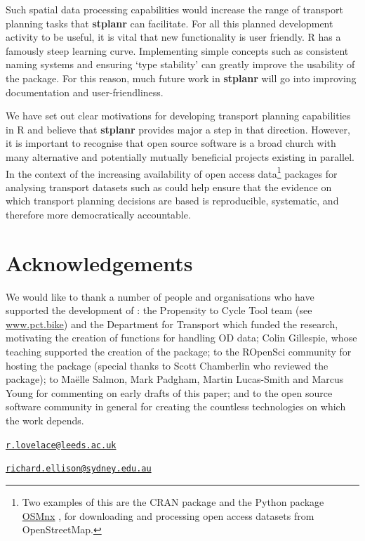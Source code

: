Such spatial data processing capabilities would increase the range of
transport planning tasks that \textbf{stplanr} can facilitate. For all
this planned development activity to be useful, it is vital that new
functionality is user friendly. R has a famously steep learning curve.
Implementing simple concepts such as consistent naming systems
\citep{baath_state_2012} and ensuring `type stability' can greatly
improve the usability of the package. For this reason, much future work
in \textbf{stplanr} will go into improving documentation and
user-friendliness.

We have set out clear motivations for
developing transport planning capabilities in R and believe that
\textbf{stplanr} provides major a step in that direction.
However, it is important to recognise that open source software is
a broad church with many alternative and potentially mutually beneficial
projects existing in parallel.
In the context of the increasing availability of open access data\footnote{Two
examples of this are the  CRAN package \citep{Padgham2017} and the Python package
\href{https://github.com/gboeing/osmnx}{OSMnx} \citep{boeing_osmnx:_2017}, for downloading and processing
open access datasets from OpenStreetMap.}
packages for analysing transport datasets such as  could help
ensure that the
evidence on which transport planning decisions are based is reproducible,
systematic, and therefore more democratically accountable.

\section{Acknowledgements}

We would like to thank a number of people and organisations who have supported the development of :
the Propensity to Cycle Tool team (see \href{http://www.pct.bike/}{www.pct.bike}) and the Department for Transport which funded the research, motivating the creation of functions for handling OD data;
Colin Gillespie, whose teaching supported the creation of the package;
to the ROpenSci community for hosting the package (special thanks to Scott Chamberlin who reviewed the package);
to Ma{\"e}lle Salmon, Mark Padgham, Martin Lucas-Smith and Marcus Young for commenting on early drafts of this paper;
and to the open source software community in general for creating the countless technologies on which the work depends.



\address{%
Robin Lovelace\\
University of Leeds\\
34-40 University Road\\ LS2 9JT, UK\\
}
\href{mailto:r.lovelace@leeds.ac.uk}{\nolinkurl{r.lovelace@leeds.ac.uk}}

\address{%
Richard Ellison\\
University of Sydney\\
378 Abercrombie Street\\ Darlington, NSW 2008, Australia\\
}
\href{mailto:richard.ellison@sydney.edu.au}{\nolinkurl{richard.ellison@sydney.edu.au}}


